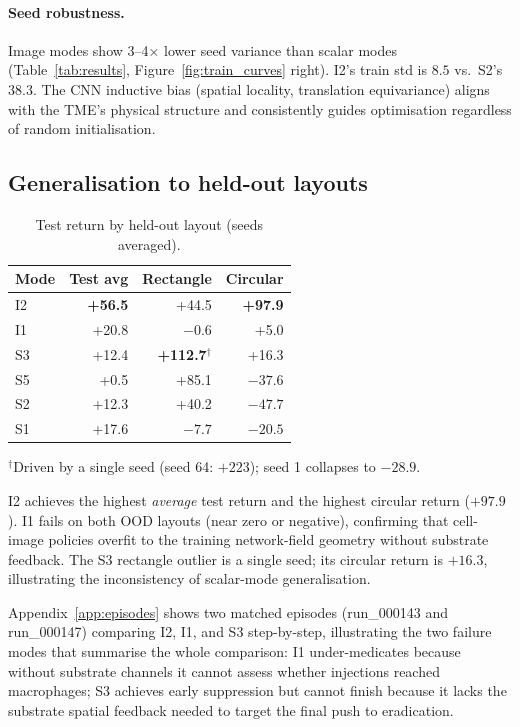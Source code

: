 \documentclass{article}
\begin{document}
\paragraph{Seed robustness.}
Image modes show 3--4$\times$ lower seed variance than scalar modes
(Table~\ref{tab:results}, Figure~\ref{fig:train_curves} right).
I2's train std is $8.5$ vs.\ S2's $38.3$.
The CNN inductive bias (spatial locality, translation equivariance) aligns
with the TME's physical structure and consistently guides optimisation
regardless of random initialisation.

\subsection{Generalisation to held-out layouts}

\begin{table}[h]
  \caption{Test return by held-out layout (seeds averaged).}
  \label{tab:layouts}
  \centering\small
  \begin{tabular}{lrrr}
    \toprule
    \textbf{Mode} & \textbf{Test avg} & \textbf{Rectangle} & \textbf{Circular} \\
    \midrule
    I2 & \textbf{+56.5} & +44.5 & \textbf{+97.9} \\
    I1 & +20.8          & $-0.6$ & +5.0 \\
    S3 & +12.4          & \textbf{+112.7}$^\dagger$ & +16.3 \\
    S5 & +0.5           & +85.1 & $-37.6$ \\
    S2 & +12.3          & +40.2 & $-47.7$ \\
    S1 & +17.6          & $-7.7$ & $-20.5$ \\
    \bottomrule
  \end{tabular}
  {\small $^\dagger$Driven by a single seed (seed 64: $+223$); seed 1 collapses to $-28.9$.}
\end{table}

I2 achieves the highest \emph{average} test return and the highest circular
return ($+97.9$).
I1 fails on both OOD layouts (near zero or negative), confirming that
cell-image policies overfit to the training network-field geometry without
substrate feedback.
The S3 rectangle outlier is a single seed; its circular return is $+16.3$,
illustrating the inconsistency of scalar-mode generalisation.

Appendix~\ref{app:episodes} shows two matched episodes (run\_000143 and
run\_000147) comparing I2, I1, and S3 step-by-step, illustrating the
two failure modes that summarise the whole comparison: I1 under-medicates
because without substrate channels it cannot assess whether injections
reached macrophages; S3 achieves early suppression but cannot finish
because it lacks the substrate spatial feedback needed to target the
final push to eradication.
\end{document}
